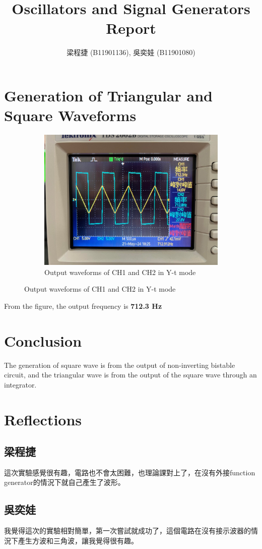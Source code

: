 \documentclass{article}
\title{Oscillators and Signal Generators Report}
\author{梁程捷 (B11901136), 吳奕娃 (B11901080)}
\date{}
\begin{document}
\begin{CJK*}{UTF8}{bkai}

\maketitle

\section*{Generation of Triangular and Square Waveforms}

\begin{figure}[h]
    \begin{center}
        \begin{subfigure}[b]{0.55\textwidth}
            \includegraphics[width=\textwidth]{square_wave_gen.jpg}
            \caption*{Output waveforms of CH1 and CH2 in Y-t mode}
        \end{subfigure}
    \end{center}
\end{figure}
From the figure, the output frequency is \textbf{712.3 \unit{\hertz}} 

\section*{Conclusion}
The generation of square wave is from the output of non-inverting bistable circuit, and the triangular wave is from the output of
the square wave through an integrator.

\section*{Reflections}
\subsection*{梁程捷}
這次實驗感覺很有趣，電路也不會太困難，也理論課對上了，在沒有外接function generator的情況下就自己產生了波形。

\subsection*{吳奕娃}
我覺得這次的實驗相對簡單，第一次嘗試就成功了，這個電路在沒有接示波器的情況下產生方波和三角波，讓我覺得很有趣。
    
\end{CJK*}
\end{document}
